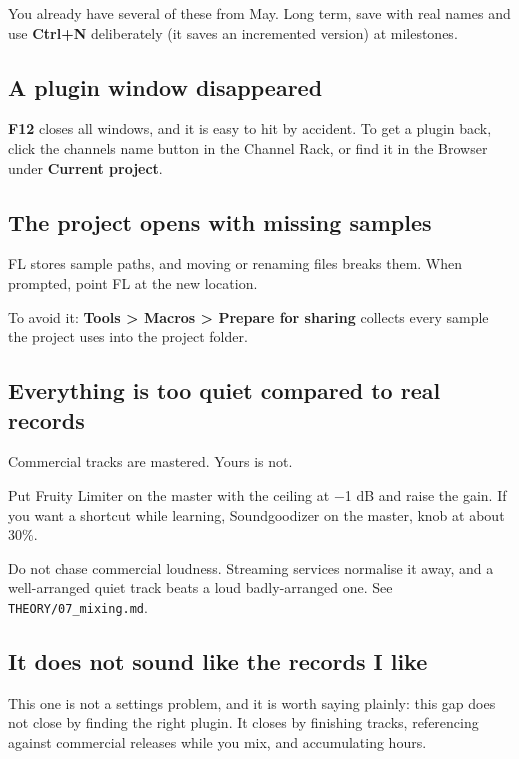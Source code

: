 You already have several of these from May. Long term, save with real names and use
\textbf{Ctrl+N} deliberately (it saves an incremented version) at milestones.

\subsection{A plugin window disappeared}\label{fl06_trouble-a-plugin-window-disappeared}

\textbf{F12} closes all windows, and it is easy to hit by accident. To get a plugin back, click
the channel\textquotesingle s name button in the Channel Rack, or find it in the Browser under \textbf{Current
project}.

\subsection{The project opens with missing samples}\label{fl06_trouble-the-project-opens-with-missing-samples}

FL stores sample paths, and moving or renaming files breaks them. When prompted, point FL at
the new location.

To avoid it: \textbf{Tools \textgreater{} Macros \textgreater{} Prepare for sharing} collects every sample the project uses
into the project folder.

\subsection{Everything is too quiet compared to real records}\label{fl06_trouble-everything-is-too-quiet-compared-to-real-records}

Commercial tracks are mastered. Yours is not.

Put Fruity Limiter on the master with the ceiling at −1 dB and raise the gain. If you want a
shortcut while learning, Soundgoodizer on the master, knob at about 30\%.

Do not chase commercial loudness. Streaming services normalise it away, and a well-arranged
quiet track beats a loud badly-arranged one. See \texttt{THEORY/07\_mixing.md}.

\subsection{It does not sound like the records I like}\label{fl06_trouble-it-does-not-sound-like-the-records-i-like}

This one is not a settings problem, and it is worth saying plainly: this gap does not close
by finding the right plugin. It closes by finishing tracks, referencing against commercial
releases while you mix, and accumulating hours.

